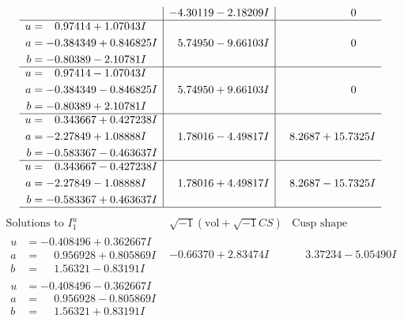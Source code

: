 \documentclass[1p]{elsarticle_modified}
\theoremstyle{definition}
\newcommand{\I}{\sqrt{-1}}
\begin{document}
$$\begin{array}{c|c|c}
 & -4.30119 - 2.18209 I & \phantom{-0.000000 } 0 \\ \hline\begin{aligned}
u &= \phantom{-}0.97414 + 1.07043 I \\
a &= -0.384349 + 0.846825 I \\
b &= -0.80389 - 2.10781 I\end{aligned}
 & \phantom{-}5.74950 - 9.66103 I & \phantom{-0.000000 } 0 \\ \hline\begin{aligned}
u &= \phantom{-}0.97414 - 1.07043 I \\
a &= -0.384349 - 0.846825 I \\
b &= -0.80389 + 2.10781 I\end{aligned}
 & \phantom{-}5.74950 + 9.66103 I & \phantom{-0.000000 } 0 \\ \hline\begin{aligned}
u &= \phantom{-}0.343667 + 0.427238 I \\
a &= -2.27849 + 1.08888 I \\
b &= -0.583367 - 0.463637 I\end{aligned}
 & \phantom{-}1.78016 - 4.49817 I & \phantom{-}8.2687 + 15.7325 I \\ \hline\begin{aligned}
u &= \phantom{-}0.343667 - 0.427238 I \\
a &= -2.27849 - 1.08888 I \\
b &= -0.583367 + 0.463637 I\end{aligned}
 & \phantom{-}1.78016 + 4.49817 I & \phantom{-}8.2687 - 15.7325 I\\
 \hline 
 \end{array}$$\newpage$$\begin{array}{c|c|c}  
\text{Solutions to }I^u_{1}& \I (\text{vol} + \sqrt{-1}CS) & \text{Cusp shape}\\
 \hline 
\begin{aligned}
u &= -0.408496 + 0.362667 I \\
a &= \phantom{-}0.956928 + 0.805869 I \\
b &= \phantom{-}1.56321 - 0.83191 I\end{aligned}
 & -0.66370 + 2.83474 I & \phantom{-}3.37234 - 5.05490 I \\ \hline\begin{aligned}
u &= -0.408496 - 0.362667 I \\
a &= \phantom{-}0.956928 - 0.805869 I \\
b &= \phantom{-}1.56321 + 0.83191 I\end{aligned}

\end{array}$$
\end{document}
